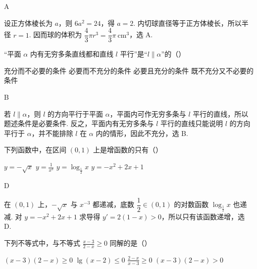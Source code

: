 \documentclass[UTF8,a4paper,oneside,11pt]{ctexbook}
\begin{document}
\begin{answer}
A
\end{answer}

\begin{solution}
设正方体棱长为 \(a\)，则 \(6a^2=24\)，得 \(a=2\). 内切球直径等于正方体棱长，所以半径 \(r=1\). 因而球的体积为 \(\dfrac43\pi r^3=\dfrac43\pi\mathrm{~cm}^3\)，选 A.
\end{solution}

\begin{problem}
“平面 \(\alpha\) 内有无穷多条直线都和直线 \(l\) 平行”是“\(l \parallel \alpha\)”的（\quad）

\choices
    {充分而不必要的条件}
    {必要而不充分的条件}
    {必要且充分的条件}
    {既不充分又不必要的条件}
\end{problem}

\begin{answer}
B
\end{answer}

\begin{solution}
若 \(l\parallel\alpha\)，则 \(l\) 的方向平行于平面 \(\alpha\)，平面内可作无穷多条与 \(l\) 平行的直线，所以题述条件是必要条件. 反之，平面内有无穷多条与 \(l\) 平行的直线只能说明 \(l\) 的方向平行于 \(\alpha\)，并不能排除 \(l\) 在 \(\alpha\) 内的情形，因此不充分，选 B.
\end{solution}

\begin{problem}
下列函数中，在区间 \((0,1)\) 上是增函数的只有（\quad）

\choices
    {\(y = -\sqrt{x}\)}
    {\(y = \frac{1}{x^3}\)}
    {\(y = \log_{\frac{1}{2}} x\)}
    {\(y = -x^2 + 2x + 1\)}
\end{problem}

\begin{answer}
D
\end{answer}

\begin{solution}
在 \((0,1)\) 上，\(-\sqrt{x}\) 与 \(x^{-3}\) 都递减，底数 \(\dfrac12\in(0,1)\) 的对数函数 \(\log_{\frac{1}{2}}x\) 也递减. 对 \(y=-x^2+2x+1\) 求导得 \(y'=2(1-x)>0\)，所以只有该函数递增，选 D.
\end{solution}

\begin{problem}
下列不等式中，与不等式 \(\frac{x - 3}{2 - x} \geqslant 0\) 同解的是（\quad）

\choices
    {\((x - 3)(2 - x) \geqslant 0\)}
    {\(\lg(x - 2) \leqslant 0\)}
    {\(\frac{2 - x}{x - 3} \geqslant 0\)}
    {\((x - 3)(2 - x) > 0\)}
\end{problem}
\end{document}
